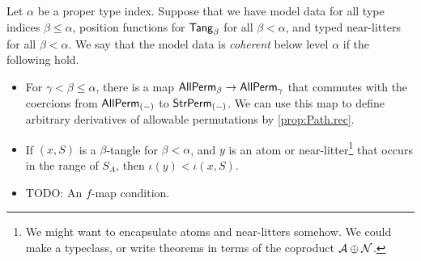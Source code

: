 \begin{definition}
  \label{def:CoherentData}
  Let \( \alpha \) be a proper type index.
  Suppose that we have model data for all type indices \( \beta \leq \alpha \), position functions for \( \mathsf{Tang}_\beta \) for all \( \beta < \alpha \), and typed near-litters for all \( \beta < \alpha \).
  We say that the model data is \emph{coherent} below level \( \alpha \) if the following hold.
  \begin{itemize}
    \item For \( \gamma < \beta \leq \alpha \), there is a map \( \mathsf{AllPerm}_\beta \to \mathsf{AllPerm}_\gamma \) that commutes with the coercions from \( \mathsf{AllPerm}_{(-)} \) to \( \mathsf{StrPerm}_{(-)} \).
    We can use this map to define arbitrary derivatives of allowable permutations by \cref{prop:Path.rec}.
    \item If \( (x, S) \) is a \( \beta \)-tangle for \( \beta < \alpha \), and \( y \) is an atom or near-litter\footnote{We might want to encapsulate atoms and near-litters somehow. We could make a typeclass, or write theorems in terms of the coproduct \( {\mathcal A} \oplus {\mathcal N} \).} that occurs in the range of \( S_A \), then \( \iota(y) < \iota(x, S) \).
    \item TODO: An \( f \)-map condition.
  \end{itemize}
\end{definition}
